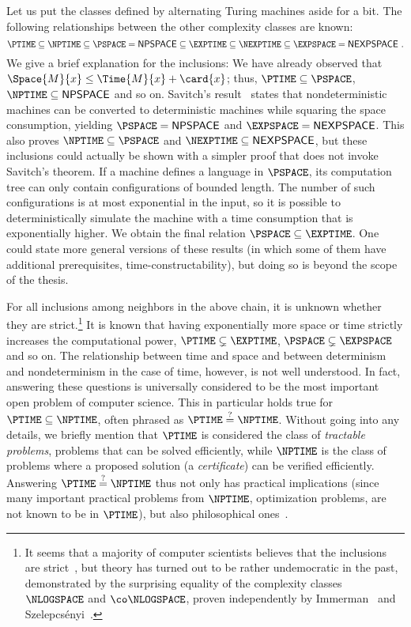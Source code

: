 \documentclass[../../diss.tex]{subfiles}
\begin{document}
Let us put the classes defined by alternating Turing machines aside for a bit.
The following relationships between the other complexity classes are known:
\[
    \PTIME \subseteq \NPTIME \subseteq \PSPACE = \mathsf{NPSPACE} \subseteq \EXPTIME \subseteq \NEXPTIME \subseteq \EXPSPACE = \mathsf{NEXPSPACE}
    \ .
\]
We give a brief explanation for the inclusions:
%
We have already observed that $\Space{M}{x} \leq \Time{M}{x} + \card{x}$; thus, $\PTIME \subseteq \PSPACE$, $\NPTIME \subseteq \mathsf{NPSPACE}$ and so on.
Savitch's result~\cite{Savitch70} states that nondeterministic machines can be converted to deterministic machines while squaring the space consumption, yielding $\PSPACE = \mathsf{NPSPACE}$ and $\EXPSPACE = \mathsf{NEXPSPACE}$.
This also proves $\NPTIME \subseteq \PSPACE$ and $\NEXPTIME \subseteq \mathsf{NEXPSPACE}$, but these inclusions could actually be shown with a simpler proof that does not invoke Savitch's theorem.
If a machine defines a language in $\PSPACE$, its computation tree can only contain configurations of bounded length.
The number of such configurations is at most exponential in the input, so it is possible to deterministically simulate the machine with a time consumption that is exponentially higher.
We obtain the final relation $\PSPACE \subseteq \EXPTIME$.
One could state more general versions of these results (in which some of them have additional prerequisites, \eg time-constructability), but doing so is beyond the scope of the thesis.

For all inclusions among neighbors in the above chain, it is unknown whether they are strict.\footnote{
    It seems that a majority of computer scientists believes that the inclusions are strict~\cite{Rosenberger12}, but theory has turned out to be rather undemocratic in the past, demonstrated \eg by the surprising equality of the complexity classes $\NLOGSPACE$ and $\co\NLOGSPACE$, proven independently by Immerman~\cite{Immerman88} and Szelepcsényi~\cite{Szelepcsenyi87}.
}
It is known that having exponentially more space or time strictly increases the computational power, \ie $\PTIME \subsetneq \EXPTIME$, $\PSPACE \subsetneq \EXPSPACE$ and so on.
The relationship between time and space and between determinism and nondeterminism in the case of time, however, is not well understood.
In fact, answering these questions is universally considered to be the most important open problem of computer science.
This in particular holds true for $\PTIME \subseteq \NPTIME$, often phrased as $\PTIME \stackrel{?}{=} \NPTIME$.
Without going into any details, we briefly mention that $\PTIME$ is considered the class of \emph{tractable problems}, problems that can be solved efficiently, while $\NPTIME$ is the class of problems where a proposed solution (a \emph{certificate}) can be verified efficiently.
Answering $\PTIME \stackrel{?}{=} \NPTIME$ thus not only has practical implications (since many important practical problems from $\NPTIME$, \eg optimization problems, are not known to be in $\PTIME$), but also philosophical ones~\cite{Fortnow13}.
\end{document}
